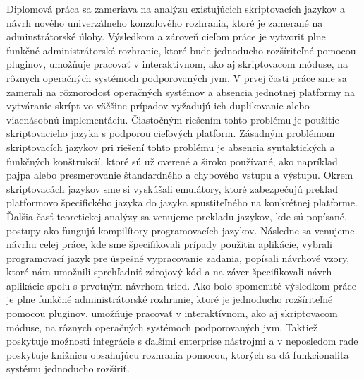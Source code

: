 \indent  Diplomová práca sa zameriava na analýzu existujúcich skriptovacích jazykov a návrh nového univerzálneho konzolového rozhrania, ktoré je  zamerané na adminstrátorské úlohy. Výsledkom a zároveň cieľom práce je vytvoriť plne funkčné administrátorské rozhranie, ktoré bude jednoducho rozšíriteľné pomocou pluginov, umožňuje pracovať v interaktívnom, ako aj skriptovacom móduse, na rôznych operačných systémoch podporovaných \acrshort{jvm}.
\newline
\indent  V prvej časti práce sme sa zamerali na rôznorodosť operačných systémov a absencia jednotnej platformy na vytváranie skrípt vo väčšine prípadov vyžadujú ich duplikovanie alebo viacnásobnú implementáciu. Čiastočným riešením tohto problému je použitie skriptovacieho jazyka s podporou cieľových platform. Zásadným problémom skriptovacích jazykov pri riešení tohto problému je absencia syntaktických a funkčných konštrukcií, ktoré sú už overené a široko používané, ako napríklad pajpa alebo presmerovanie štandardného a chybového vstupu a výstupu. Okrem skriptovacách jazykov sme si vyskúšali emulátory, ktoré zabezpečujú preklad platformovo špecifického jazyka do jazyka spustiteľného na konkrétnej platforme. Ďalšia časť teoretickej analýzy sa venujeme prekladu jazykov, kde sú popísané, postupy ako fungujú kompilítory programovacích jazykov.  Následne sa venujeme návrhu celej práce, kde sme špecifikovali prípady použitia aplikácie, vybrali programovací jazyk pre úspešné vypracovanie zadania, popísali návrhové vzory, ktoré nám umožnili sprehľadniť zdrojový kód a na záver špecifikovali návrh aplikácie spolu s prvotným návrhom tried. 
\newline
\indent Ako bolo spomenuté výsledkom práce je plne funkčné administrátorské rozhranie, ktoré je jednoducho rozšíriteľné pomocou pluginov, umožňuje pracovať v interaktívnom, ako aj skriptovacom móduse, na rôznych operačných systémoch podporovaných \acrshort{jvm}. Taktiež poskytuje možnosti integrácie s ďalšími enterprise nástrojmi a v neposledom rade poskytuje knižnicu obsahujúcu rozhrania pomocou, ktorých sa dá funkcionalita systému jednoducho rozšíriť.